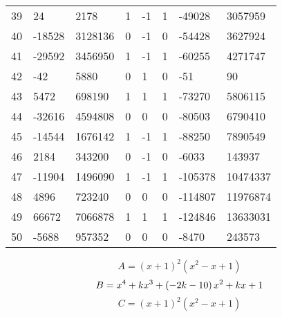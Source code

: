 \documentclass{amsart}
\begin{document}
\begin{longtable}{|l|l|l|lllll|}
39&24&2178&1&-1&1&-49028&3057959\\
40&-18528&3128136&0&-1&0&-54428&3627924\\
41&-29592&3456950&1&-1&1&-60255&4271747\\
42&-42&5880&0&1&0&-51&90\\
43&5472&698190&1&1&1&-73270&5806115\\
44&-32616&4594808&0&0&0&-80503&6790410\\
45&-14544&1676142&1&-1&1&-88250&7890549\\
46&2184&343200&0&-1&0&-6033&143937\\
47&-11904&1496090&1&-1&1&-105378&10474337\\
48&4896&723240&0&0&0&-114807&11976874\\
49&66672&7066878&1&1&1&-124846&13633031\\
50&-5688&957352&0&0&0&-8470&243573\\
\hline
\end{longtable}
$$A=(x
 + 1)^{2}(x^2
 - x
 + 1)$$
$$B=x^4
 + k\*x^3
 + \left(-2\*k
 - 10\right) \*x^2
 + k\*x
 + 1$$
$$C=(x
 + 1)^{2}(x^2
 - x
 + 1)$$
\end{document}
